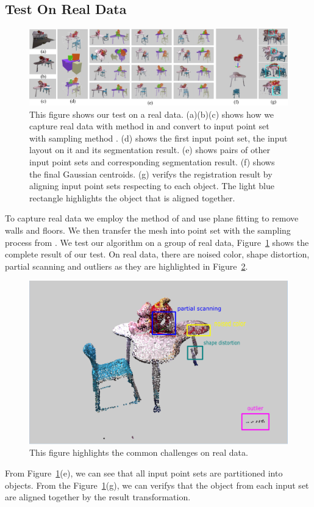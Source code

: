 \subsection{Test On Real Data}
\begin{figure}[htb]
	\centering
	\includegraphics[width=\linewidth]{images/realdata/realdata}
	\caption{\label{fig:realdata}This figure shows our test on a real data. (a)(b)(c) shows how we capture real data with method in \cite{VXH} and convert to input point set with sampling method \cite{PossionSampling}. (d) shows the first input point set, the input layout on it and its segmentation result. (e) shows pairs of other input point sets and corresponding segmentation result. (f) shows the final Gaussian centroids. (g) verifys the registration result by aligning input point sets respecting to each object. The light blue rectangle highlights the object that is aligned together. }
\end{figure}
To capture real data we employ the method of \cite{VXH} and use plane fitting to remove walls and floors. We then transfer the mesh into point set with the sampling process from \cite{PossionSampling}.
We test our algorithm on a group of real data, Figure~{\ref{fig:realdata}} shows the complete result of our test. On real data, there are noised color, shape distortion, partial scanning and outliers as they are highlighted in Figure~\ref{fig:challenge}. 
\begin{figure}
	\centering
	\includegraphics[width=\linewidth]{images/challenge/challenge}
	\caption{\label{fig:challenge}This figure highlights the common challenges on real data.}
\end{figure}
From Figure~\ref{fig:realdata}(e), we can see that all input point sets are partitioned into objects. From the Figure~\ref{fig:realdata}(g), we can verifys that the object from each input set are aligned together by the result transformation.  
